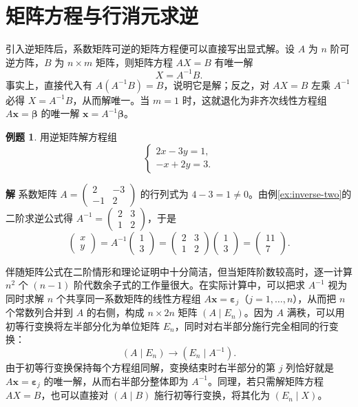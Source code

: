 \documentclass[UTF8, fontset=fandol, a4paper, 12pt]{ctexart}
\newcommand{\vx}{\boldsymbol{x}}
\newcommand{\vb}{\boldsymbol{\beta}}
\newcommand{\ve}{\boldsymbol{\varepsilon}}
\theoremstyle{definition}
\newtheorem{example}[definition]{例题}
\begin{document}
\section{矩阵方程与行消元求逆}

引入逆矩阵后，系数矩阵可逆的矩阵方程便可以直接写出显式解。设 $A$ 为 $n$ 阶可逆方阵，$B$ 为 $n\times m$ 矩阵，则矩阵方程 $AX=B$ 有唯一解
\[
 X=A^{-1}B.
\]
事实上，直接代入有 $A(A^{-1}B)=B$，说明它是解；反之，对 $AX=B$ 左乘 $A^{-1}$ 必得 $X=A^{-1}B$，从而解唯一。当 $m=1$ 时，这就退化为非齐次线性方程组 $A\vx=\vb$ 的唯一解 $\vx=A^{-1}\vb$。

\begin{example}
用逆矩阵解方程组
\[
 \begin{cases}2x-3y=1,\\-x+2y=3.\end{cases}
\]
\end{example}
\noindent\textbf{解}\quad
系数矩阵 $A=\begin{pmatrix}2&-3\\-1&2\end{pmatrix}$ 的行列式为 $4-3=1\ne0$。由例\ref{ex:inverse-two}的二阶求逆公式得 $A^{-1}=\begin{pmatrix}2&3\\1&2\end{pmatrix}$，于是
\[
 \begin{pmatrix}x\\y\end{pmatrix}
 =A^{-1}\begin{pmatrix}1\\3\end{pmatrix}
 =\begin{pmatrix}2&3\\1&2\end{pmatrix}\begin{pmatrix}1\\3\end{pmatrix}
 =\begin{pmatrix}11\\7\end{pmatrix}.
\]

伴随矩阵公式在二阶情形和理论证明中十分简洁，但当矩阵阶数较高时，逐一计算 $n^2$ 个 $(n-1)$ 阶代数余子式的工作量很大。在实际计算中，可以把求 $A^{-1}$ 视为同时求解 $n$ 个共享同一系数矩阵的线性方程组 $A\vx=\ve_j$（$j=1,\ldots,n$），从而把 $n$ 个常数列合并到 $A$ 的右侧，构成 $n\times 2n$ 矩阵 $(A\mid E_n)$。因为 $A$ 满秩，可以用初等行变换将左半部分化为单位矩阵 $E_n$，同时对右半部分施行完全相同的行变换：
\[
 (A\mid E_n)\longrightarrow(E_n\mid A^{-1}).
\]
由于初等行变换保持每个方程组同解，变换结束时右半部分的第 $j$ 列恰好就是 $A\vx=\ve_j$ 的唯一解，从而右半部分整体即为 $A^{-1}$。同理，若只需解矩阵方程 $AX=B$，也可以直接对 $(A\mid B)$ 施行初等行变换，将其化为 $(E_n\mid X)$。
\end{document}
